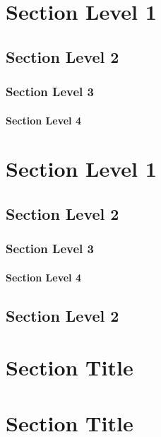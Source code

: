 \section*{Section Level 1}

\subsection*{Section Level 2}

\subsubsection*{Section Level 3}

\paragraph*{Section Level 4}


\section*{Section Level 1}
\subsection*{Section Level 2}
\subsubsection*{Section Level 3}
\paragraph*{Section Level 4}
\subsection*{Section Level 2}

\section*{Section Title}

\section*{Section Title}

